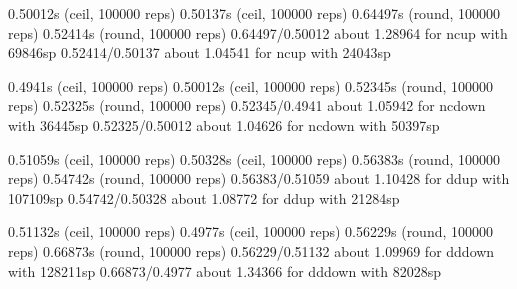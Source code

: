 0.50012s (ceil, 100000 reps)                            0.50137s (ceil, 100000 reps)                           
0.64497s (round, 100000 reps)                           0.52414s (round, 100000 reps)                          
0.64497/0.50012 about 1.28964 for ncup with 69846sp     0.52414/0.50137 about 1.04541 for ncup with 24043sp    
                                                                                                               
0.4941s (ceil, 100000 reps)                             0.50012s (ceil, 100000 reps)                           
0.52345s (round, 100000 reps)                           0.52325s (round, 100000 reps)                          
0.52345/0.4941 about 1.05942 for ncdown with 36445sp    0.52325/0.50012 about 1.04626 for ncdown with 50397sp  
                                                                                                               
0.51059s (ceil, 100000 reps)                            0.50328s (ceil, 100000 reps)                           
0.56383s (round, 100000 reps)                           0.54742s (round, 100000 reps)                          
0.56383/0.51059 about 1.10428 for ddup with 107109sp    0.54742/0.50328 about 1.08772 for ddup with 21284sp    
                                                                                                               
0.51132s (ceil, 100000 reps)                            0.4977s (ceil, 100000 reps)                            
0.56229s (round, 100000 reps)                           0.66873s (round, 100000 reps)                          
0.56229/0.51132 about 1.09969 for dddown with 128211sp  0.66873/0.4977 about 1.34366 for dddown with 82028sp   
